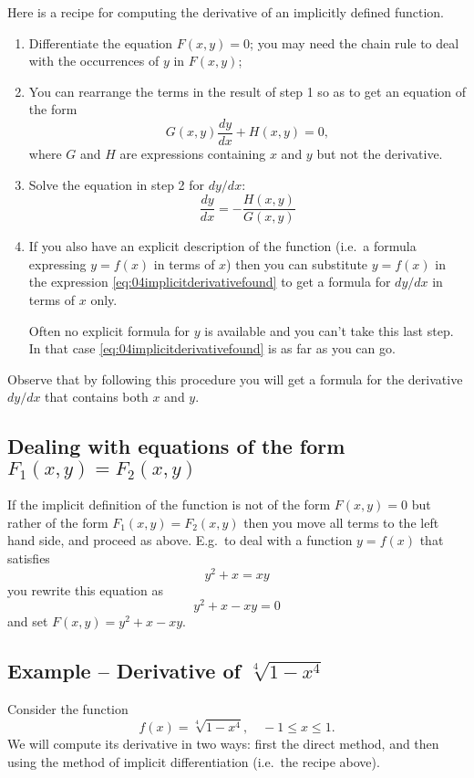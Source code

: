 Here is a recipe for computing the derivative of an implicitly defined
function.
\begin{enumerate}
\item Differentiate the equation $F(x, y)=0$; you may need the chain
  rule to deal with the occurrences of $y$ in $F(x, y)$;

\item You can rearrange the terms in the result of step 1 so as to get
  an equation of the form
  \begin{equation}\label{eq:04imp-deriv-step2}
    G(x, y)\dfrac{dy}{dx}+H(x, y)=0,
  \end{equation}
  where $G$ and $H$ are expressions containing $x$ and $y$ but not the
  derivative.

\item Solve the equation in step 2 for ${dy}/{dx}$:
  \begin{equation}\label{eq:04implicitderivativefound}
    \frac{dy}{dx} = -\frac{H(x, y)}{G(x, y)}
  \end{equation}

\item If you also have an explicit description of the function (i.e.\
  a formula expressing $y=f(x)$ in terms of $x$) then you can
  substitute $y=f(x)$ in the expression
  \eqref{eq:04implicitderivativefound} to get a formula for $dy/dx$ in
  terms of $x$ only.

  Often no explicit formula for $y$ is available and you can't take
  this last step.  In that case \eqref {eq:04implicitderivativefound}
  is as far as you can go.
\end{enumerate}
Observe that by following this procedure you will get a formula for
the derivative ${dy}/{dx}$ that contains both $x$ and $y$.
\subsection{Dealing with equations of the form $F_1(x,y) = F_2(x, y)$} 
If the implicit definition of the function is not of the form $F(x,y)=0$ but
rather of the form $F_1(x,y) = F_2(x, y)$ then you move all terms to the
left hand side, and proceed as above.  E.g.\ to deal with a function $y=f(x)$
that satisfies
\[
y^2+x = xy
\]
you rewrite this equation as
\[
y^2+x-xy = 0
\]
and set $F(x, y) = y^2+x-xy$.




\subsection{Example -- Derivative of $\sqrt[4]{1-x^4}$} 
Consider the function
\[
f(x) = \sqrt[4]{1-x^4}, \quad -1\leq x\leq 1.
\]
We will compute its derivative in two ways: first the direct method,
and then using the method of implicit differentiation (i.e.\ the recipe
above).




